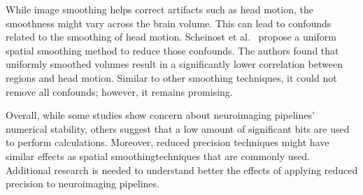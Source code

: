While image smoothing helps correct artifacts such as head motion, the smoothness might vary across the brain volume.
This can lead to confounds related to the smoothing of head motion.
Scheinost et al.~\cite{Scheinost2014-ds} propose a uniform spatial smoothing method
to reduce those confounds.
The authors found that uniformly smoothed volumes result in a significantly lower
correlation between regions and head motion.
Similar to other smoothing techniques, it could not remove all confounds; however, it remains promising. 
	
Overall, while some studies show concern about neuroimaging pipelines' numerical stability,
others suggest that a low amount of significant bits are used to perform calculations. 
Moreover, reduced precision techniques might have similar effects as spatial smoothingtechniques that are commonly used.
Additional research is needed to understand better the effects of applying reduced precision to neuroimaging pipelines.
